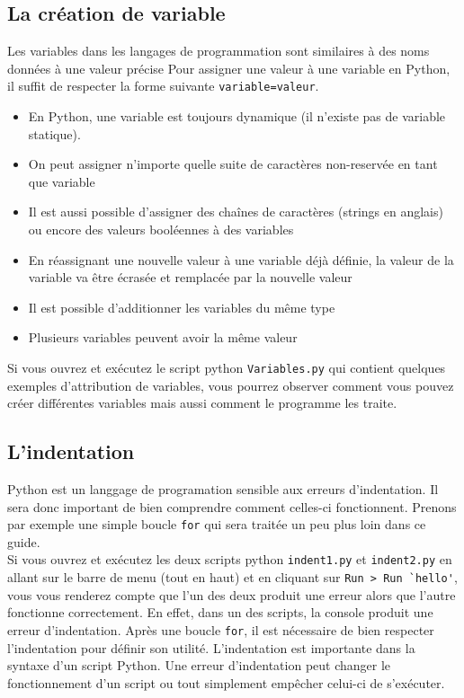 \subsection{La création de variable}

Les variables dans les langages de programmation sont similaires à des noms données à une valeur précise
Pour assigner une valeur à une variable en Python, il suffit de respecter la forme suivante \lstinline{variable=valeur}.

\begin{conseil}
\begin{itemize}
	\item En Python, une variable est  toujours dynamique (il n'existe pas de variable statique).
	\item On peut assigner n'importe quelle suite de caractères non-reservée en tant que variable
	\item Il est aussi possible d'assigner des chaînes de caractères (strings en anglais) ou encore des valeurs booléennes à des variables
	\item En réassignant une nouvelle valeur à une variable déjà définie, la valeur de la variable va être écrasée et remplacée par la nouvelle valeur
	\item Il est possible d'additionner les variables du même type
	\item Plusieurs variables peuvent avoir la même valeur
\end{itemize}
\end{conseil}


Si vous ouvrez et exécutez le script python \lstinline{Variables.py} qui contient quelques exemples d'attribution de variables, vous pourrez observer comment vous pouvez créer différentes variables mais aussi comment le programme les traite.


\subsection{L'indentation}

Python est un langgage de programation sensible aux erreurs d'indentation. Il sera donc important de bien comprendre comment celles-ci fonctionnent. Prenons par exemple une simple boucle \lstinline{for} qui sera traitée un peu plus loin dans ce guide.\\

Si vous ouvrez et exécutez les deux scripts python \lstinline{indent1.py} et \lstinline{indent2.py} en allant sur le barre de menu (tout en haut) et en cliquant sur \lstinline{Run > Run `hello'}, vous vous renderez compte que l'un des deux produit une erreur alors que l'autre fonctionne correctement. En effet, dans un des scripts, la console produit une erreur d'indentation. Après une boucle \lstinline{for}, il est nécessaire de bien respecter l'indentation pour définir son utilité. L'indentation est importante dans la syntaxe d'un script Python. Une erreur d'indentation peut changer le fonctionnement d'un script ou tout simplement empêcher celui-ci de s'exécuter.



